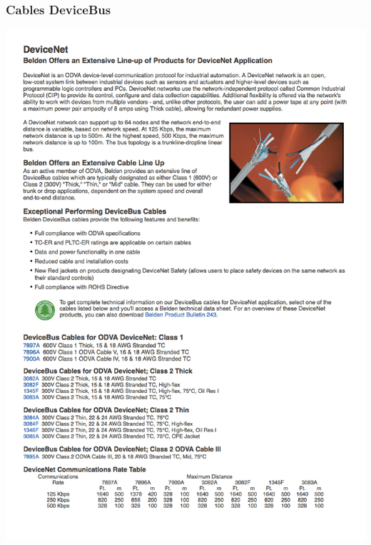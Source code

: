 \subsubsection{Cables DeviceBus}
\includegraphics[width=1\textwidth]{Datasheets/DeviceBus.png}
\newpage

